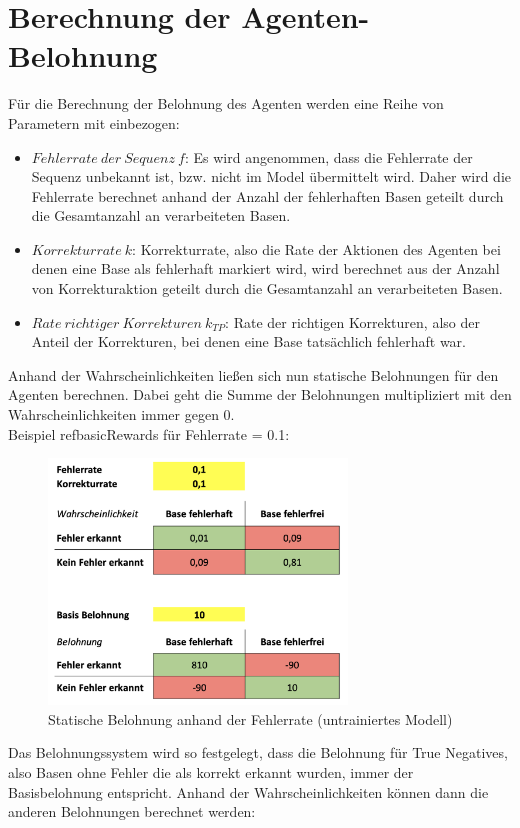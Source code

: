 \documentclass[oneside,bibliography=totocnumbered,BCOR=5mm]{scrbook}%
\theoremstyle{definition}
\theoremstyle{definition}
\theoremstyle{definition}
\theoremstyle{definition}
\theoremstyle{definition}
\theoremstyle{definition}
\begin{document}
\section{Berechnung der Agenten-Belohnung}
Für die Berechnung der Belohnung des Agenten werden eine Reihe von Parametern mit einbezogen:
\begin{itemize}
  \item \(Fehlerrate\:der\:Sequenz\:f\): Es wird angenommen, dass die Fehlerrate der Sequenz unbekannt ist, bzw. nicht im Model übermittelt wird. 
Daher wird die Fehlerrate berechnet anhand der Anzahl der fehlerhaften Basen geteilt durch 
die Gesamtanzahl an verarbeiteten Basen.
\item \(Korrekturrate\:k\): Korrekturrate, also die Rate der Aktionen des Agenten bei denen eine Base als fehlerhaft markiert wird,
 wird berechnet aus der Anzahl von Korrekturaktion geteilt durch die Gesamtanzahl an verarbeiteten Basen.
 \item \(Rate\:richtiger\:Korrekturen\:k_{TP}\): Rate der richtigen Korrekturen, also der Anteil der Korrekturen, bei
 denen eine Base tatsächlich fehlerhaft war.
\end{itemize}


Anhand der Wahrscheinlichkeiten ließen sich nun statische Belohnungen für den Agenten berechnen.
Dabei geht die Summe der Belohnungen multipliziert mit den Wahrscheinlichkeiten immer gegen 0.\\

Beispiel ref{basicRewards} für Fehlerrate = 0.1:

\begin{figure}[h]
  \centering
  \includegraphics[width=300px,keepaspectratio]{images/static_reward.png}
  \caption{Statische Belohnung anhand der Fehlerrate (untrainiertes Modell)}
  \label{basicRewards}
\end{figure}

Das Belohnungssystem wird so festgelegt, dass die Belohnung für True Negatives,
also Basen ohne Fehler die als korrekt erkannt wurden, immer der Basisbelohnung entspricht.
Anhand der Wahrscheinlichkeiten können dann die anderen Belohnungen berechnet werden:\\
\linebreak[4]
\end{document}

